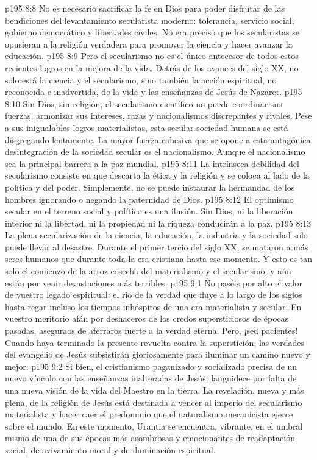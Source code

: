 \vs p195 8:8 No es necesario sacrificar la fe en Dios para poder disfrutar de las bendiciones del levantamiento secularista moderno: tolerancia, servicio social, gobierno democrático y libertades civiles. No era preciso que los secularistas se opusieran a la religión verdadera para promover la ciencia y hacer avanzar la educación.
\vs p195 8:9 Pero el secularismo no es el único antecesor de todos estos recientes logros en la mejora de la vida. Detrás de los avances del siglo XX, no solo está la ciencia y el secularismo, sino también la acción espiritual, no reconocida e inadvertida, de la vida y las enseñanzas de Jesús de Nazaret.
\vs p195 8:10 Sin Dios, sin religión, el secularismo científico no puede coordinar sus fuerzas, armonizar sus intereses, razas y nacionalismos discrepantes y rivales. Pese a sus inigualables logros materialistas, esta secular sociedad humana se está disgregando lentamente. La mayor fuerza cohesiva que se opone a esta antagónica desintegración de la sociedad secular es el nacionalismo. Aunque el nacionalismo sea la principal barrera a la paz mundial.
\vs p195 8:11 La intrínseca debilidad del secularismo consiste en que descarta la ética y la religión y se coloca al lado de la política y del poder. Simplemente, no se puede instaurar la hermandad de los hombres ignorando o negando la paternidad de Dios.
\vs p195 8:12 El optimismo secular en el terreno social y político es una ilusión. Sin Dios, ni la liberación interior ni la libertad, ni la propiedad ni la riqueza conducirán a la paz.
\vs p195 8:13 La plena secularización de la ciencia, la educación, la industria y la sociedad solo puede llevar al desastre. Durante el primer tercio del siglo XX, se mataron a más seres humanos que durante toda la era cristiana hasta ese momento. Y esto es tan solo el comienzo de la atroz cosecha del materialismo y el secularismo, y aún están por venir devastaciones más terribles.
\vs p195 9:1 No paséis por alto el valor de vuestro legado espiritual: el río de la verdad que fluye a lo largo de los siglos hasta regar incluso los tiempos inhóspitos de una era materialista y secular. En vuestro meritorio afán por deshaceros de los credos supersticiosos de épocas pasadas, aseguraos de aferraros fuerte a la verdad eterna. Pero, ¡sed pacientes! Cuando haya terminado la presente revuelta contra la superstición, las verdades del evangelio de Jesús subsistirán gloriosamente para iluminar un camino nuevo y mejor.
\vs p195 9:2 Si bien, el cristianismo paganizado y socializado precisa de un nuevo vínculo con las enseñanzas inalteradas de Jesús; languidece por falta de una nueva visión de la vida del Maestro en la tierra. La revelación, nueva y más plena, de la religión de Jesús está destinada a vencer al imperio del secularismo materialista y hacer caer el predominio que el naturalismo mecanicista ejerce sobre el mundo. En este momento, Urantia se encuentra, vibrante, en el umbral mismo de una de sus épocas más asombrosas y emocionantes de readaptación social, de avivamiento moral y de iluminación espiritual.
